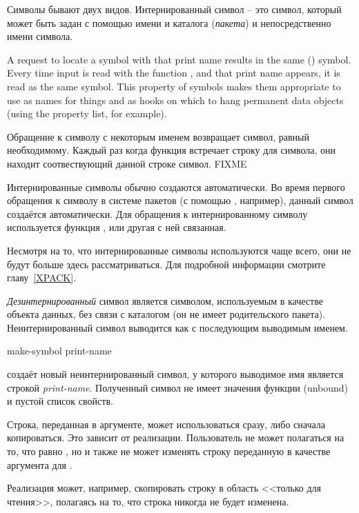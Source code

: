 Символы бывают двух видов.
Интернированный символ -- это символ, который может быть задан с помощью имени и
каталога (\emph{пакета}) и непосредственно имени символа.

A request to locate a symbol with that print name results
in the same () symbol.  Every time input is read with the
function ,
and that print name appears, it is read as the same symbol.
This property of symbols makes them appropriate to use as names for
things and as hooks on which to hang permanent data objects
(using the property list, for example).

Обращение к символу с некоторым именем возвращает символ, равный 
необходимому. Каждый раз когда функция  встречает строку для 
символа, они находит соотвествующий данной строке символ. FIXME 

Интернированные символы обычно создаются автоматически. Во время первого
обращения к символу в системе пакетов (с помощью , например), данный
символ создаётся автоматически. Для обращения к
интернированному символу используется функция , или другая с ней
связанная.

Несмотря на то, что интернированные символы используются чаще всего, они не
будут больше здесь рассматриваться. Для подробной информации смотрите
главу~\ref{XPACK}.

\emph{Дезинтернированный} символ является символом, используемым в качестве
объекта данных, без связи с каталогом (он не имеет родительского пакета).
Неинтернированный символ выводится как \cd{\#:} с последующим выводимым именем.

\begin{defun}[Функция]
make-symbol print-name

 создаёт новый неинтернированный символ, у
которого выводимое имя является строкой \emph{print-name}. Полученный символ не
имеет значения функции (unbound) и пустой список свойств.

Строка, переданная в аргументе, может использоваться сразу, либо сначала
копироваться. Это зависит от реализации.
Пользователь не может полагаться на то, что  равно  , но и также не может изменять строку
переданную в качестве аргумента для .

\beforenoterule
\begin{implementation}
Реализация может, например, скопировать строку в область <<только для чтения>>,
полагаясь на то, что строка никогда не будет изменена.
\end{implementation}
\afternoterule
\end{defun}

